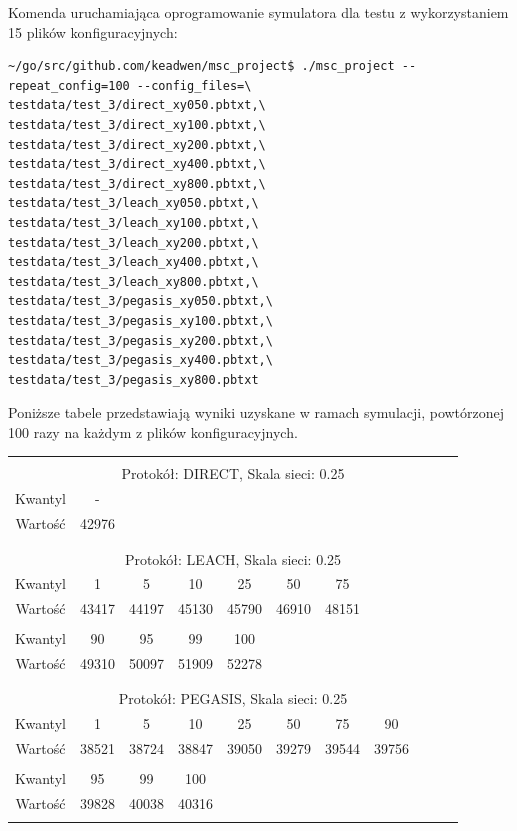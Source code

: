 \documentclass[a4paper,12pt,twoside,openany]{report}
\begin{document}
Komenda uruchamiająca oprogramowanie symulatora dla testu z wykorzystaniem 15 plików konfiguracyjnych:

\begin{lstlisting}
~/go/src/github.com/keadwen/msc_project$ ./msc_project --repeat_config=100 --config_files=\
testdata/test_3/direct_xy050.pbtxt,\
testdata/test_3/direct_xy100.pbtxt,\
testdata/test_3/direct_xy200.pbtxt,\
testdata/test_3/direct_xy400.pbtxt,\
testdata/test_3/direct_xy800.pbtxt,\
testdata/test_3/leach_xy050.pbtxt,\
testdata/test_3/leach_xy100.pbtxt,\
testdata/test_3/leach_xy200.pbtxt,\
testdata/test_3/leach_xy400.pbtxt,\
testdata/test_3/leach_xy800.pbtxt,\
testdata/test_3/pegasis_xy050.pbtxt,\
testdata/test_3/pegasis_xy100.pbtxt,\
testdata/test_3/pegasis_xy200.pbtxt,\
testdata/test_3/pegasis_xy400.pbtxt,\
testdata/test_3/pegasis_xy800.pbtxt
\end{lstlisting}

Poniższe tabele przedstawiają wyniki uzyskane w ramach symulacji, powtórzonej 100 razy na każdym z plików konfiguracyjnych. 

\begin{longtable}{*{11}{c}}
\toprule \\*
\multicolumn{11}{c}{Protokół: DIRECT, Skala sieci: 0.25} \\*
Kwantyl	& -	\\*
Wartość	& 42976	\\*
\midrule \\*
\\*
\multicolumn{11}{c}{Protokół: LEACH, Skala sieci: 0.25} \\*
Kwantyl	& 1	& 5	& 10	& 25	& 50	& 75	\\*
Wartość	& 43417	& 44197	& 45130	& 45790	& 46910	& 48151	\\*
& \\*
Kwantyl	& 90	& 95	& 99	& 100	\\*
Wartość	& 49310	& 50097	& 51909	& 52278	\\*
\midrule \\*
\\*
\multicolumn{11}{c}{Protokół: PEGASIS, Skala sieci: 0.25} \\*
Kwantyl	& 1	& 5	& 10	& 25	& 50	& 75	& 90	\\*
Wartość	& 38521	& 38724	& 38847	& 39050	& 39279	& 39544	& 39756	\\*
& \\*
Kwantyl	& 95	& 99	& 100	\\*
Wartość	& 39828	& 40038	& 40316	\\*
\bottomrule \\*
\end{longtable}
\end{document}
